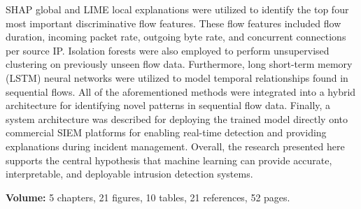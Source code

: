 \begin{SingleSpace}
SHAP global and LIME local explanations were utilized to identify the top four most important discriminative flow features. These flow features included flow duration, incoming packet rate, outgoing byte rate, and concurrent connections per source IP. Isolation forests were also employed to perform unsupervised clustering on previously unseen flow data. Furthermore, long short-term memory (LSTM) neural networks were utilized to model temporal relationships found in sequential flows. All of the aforementioned methods were integrated into a hybrid architecture for identifying novel patterns in sequential flow data. Finally, a system architecture was described for deploying the trained model directly onto commercial SIEM platforms for enabling real-time detection and providing explanations during incident management. Overall, the research presented here supports the central hypothesis that machine learning can provide accurate, interpretable, and deployable intrusion detection systems.

\vspace{0.8em}


\vspace{0.8em}

\noindent \textbf{Volume:} 5 chapters, 21 figures, 10 tables, 21 references, 52 pages.

\end{SingleSpace}